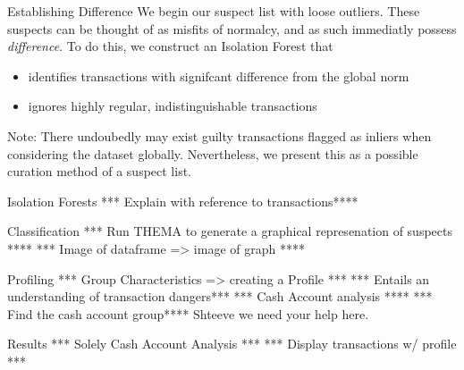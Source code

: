 \documentclass[aspectratio=169]{beamer}
\begin{document}
  \begin{frame}{Establishing Difference}
    We begin our suspect list with loose outliers. These suspects can be thought 
    of as misfits of normalcy, and as such immediatly possess \textit{difference}.
    To do this, we construct an Isolation Forest that
    \begin{itemize}
      \item identifies transactions with signifcant difference from the global norm
      \item ignores highly regular, indistinguishable transactions 
    \end{itemize}
    Note: There undoubedly may exist guilty transactions flagged as inliers when considering
    the dataset globally. Nevertheless, we present this as a possible curation method of a suspect
    list.
  \end{frame}

  \begin{frame}{Isolation Forests}
    *** Explain with reference to transactions**** 
  \end{frame}


  \begin{frame}{Classification}
    *** Run THEMA to generate a graphical represenation of suspects ****
    *** Image of dataframe => image of graph **** 
  \end{frame}

  \begin{frame}{Profiling}
      *** Group Characteristics => creating a Profile ***
      *** Entails an understanding of transaction dangers*** 
      *** Cash Account analysis **** 
      *** Find the cash account group**** 
      Shteeve we need your help here. 
  \end{frame}


  \begin{frame}{Results}
    *** Solely Cash Account Analysis *** 
    *** Display transactions w/ profile *** 
  \end{frame}
\end{document}
